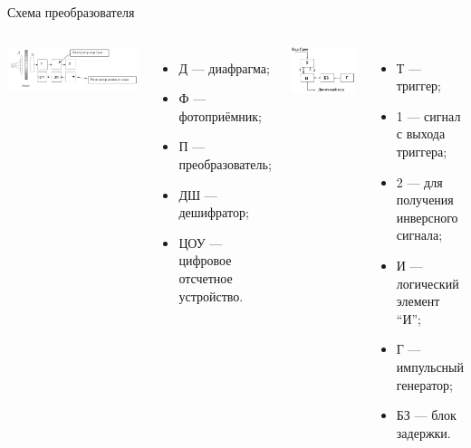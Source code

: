 \begin{frame}{Схема преобразователя}
    \centering
    \begin{columns}
        \includegraphics[width=1\linewidth]{../Figures/commonchanger.png}
        {\footnotesize
            \begin{itemize}
                \item Д --- диафрагма;
                \item Ф --- фотоприёмник;
                \item П --- преобразователь;
                \item ДШ --- дешифратор;
                \item ЦОУ --- цифровое отсчетное устройство.
            \end{itemize}
        }
        \includegraphics[width=.6\linewidth]{../Figures/changer.png}
        {\scriptsize
            \begin{itemize}
                \item Т --- триггер;
                \item 1 --- сигнал с выхода триггера;
                \item 2 --- для получения инверсного сигнала;
                \item И --- логический элемент ``И'';
                \item Г --- импульсный генератор;
                \item БЗ --- блок задержки.
            \end{itemize}
        }
    \end{columns}
\end{frame}

